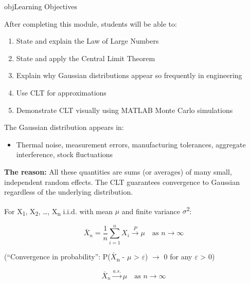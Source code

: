 \begin{PSbox}[unbreakable]{obj}{Learning Objectives}

After completing this module, students will be able to:

\begin{enumerate}
\def\labelenumi{\arabic{enumi}.}
\tightlist
\item
  State and explain the Law of Large Numbers
\item
  State and apply the Central Limit Theorem
\item
  Explain why Gaussian distributions appear so frequently in engineering
\item
  Use CLT for approximations
\item
  Demonstrate CLT visually using MATLAB Monte Carlo simulations
\end{enumerate}

\end{PSbox}


The Gaussian distribution appears in:

\begin{itemize}
\tightlist
\item
  Thermal noise, measurement errors, manufacturing tolerances, aggregate interference, stock fluctuations
\end{itemize}

\textbf{The reason:} All these quantities are sums (or averages) of many small, independent random effects. The CLT guarantees convergence to Gaussian regardless of the underlying distribution.



For X\textsubscript{1}, X\textsubscript{2}, …, X\textsubscript{n} i.i.d. with mean \ensuremath{\mu} and finite variance \ensuremath{\sigma}\textsuperscript{2}:

\[\bar{X}_n = \frac{1}{n}\sum_{i=1}^n X_i \xrightarrow{P} \mu \quad \text{as } n \to \infty\]

(``Convergence in probability'': P(\textbar{}\ensuremath{\bar{X}}\textsubscript{n} - \ensuremath{\mu}\textbar{} \textgreater{} \ensuremath{\varepsilon}) \ensuremath{\to} 0 for any \ensuremath{\varepsilon} \textgreater{} 0)


\[\bar{X}_n \xrightarrow{a.s.} \mu \quad \text{as } n \to \infty\]

